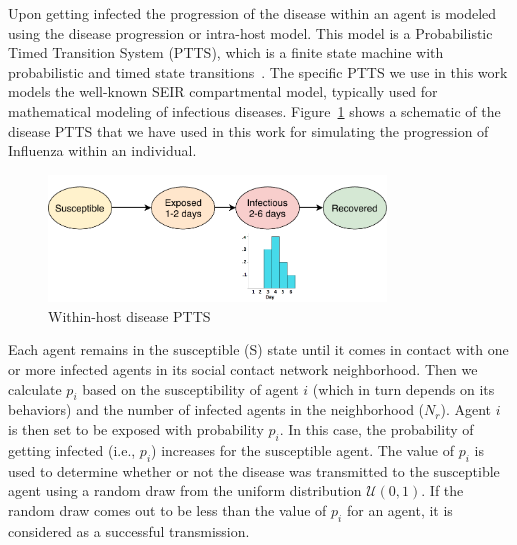 \documentclass[doublespace,draft]{VTthesis}
\begin{document}
    Upon getting infected the progression of the disease within an agent is modeled using the disease progression or intra-host model. This model is a Probabilistic Timed Transition System (PTTS), which is a finite state machine with probabilistic and timed state transitions~\cite{bisset2009modeling}. The specific PTTS we use in this work models the well-known SEIR compartmental model, typically used for mathematical modeling of infectious diseases. Figure~\ref{fig:disease} shows a schematic of the disease PTTS that we have used in this work for simulating the progression of Influenza within an individual. 
    \begin{figure}
    \centering
    \includegraphics[width=0.8\textwidth]{figures/disease-fsm.pdf}
    \caption{Within-host disease PTTS}
    \label{fig:disease}
    \end{figure}
    
    Each agent remains in the susceptible (S) state until it comes in contact with one or more infected agents in its social contact network neighborhood. Then we calculate $p_i$ based on the susceptibility of agent $i$ (which in turn depends on its behaviors) and the number of infected agents in the neighborhood ($N_r$). Agent $i$ is then set to be exposed with probability $p_i$. In this case, the probability of getting infected (i.e., $p_i$) increases for the susceptible agent. The value of $p_i$ is used to determine whether or not the disease was transmitted to the susceptible agent using a random draw from the uniform distribution $\mathcal{U}(0,1)$. If the random draw comes out to be less than the value of $p_i$ for an agent, it is considered as a successful transmission. 
    
\end{document}

